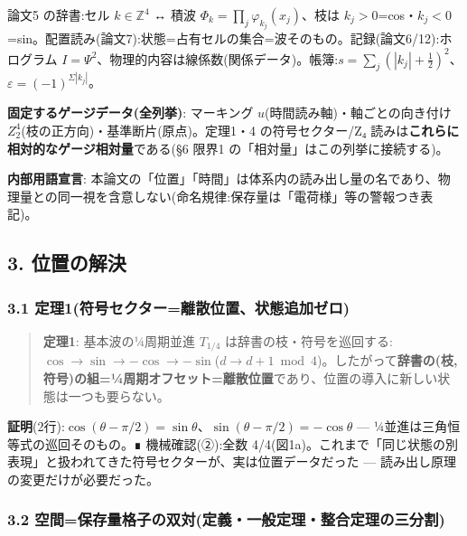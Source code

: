 \documentclass[
]{ltjsarticle}
\begin{document}
論文5 の辞書:セル \(k\in\mathbb{Z}^4\) ↔ 積波
\(\Phi_k=\prod_j\varphi_{k_j}(x_j)\)、枝は
\(k_j>0\)=cos・\(k_j<0\)=sin。配置読み(論文7):状態=占有セルの集合=波そのもの。記録(論文6/12):ホログラム
\(I=\Psi^2\)、物理的内容は線係数(関係データ)。帳簿:\(s=\sum_j(|k_j|+\tfrac12)^2\)、\(\varepsilon=(-1)^{\Sigma|k_j|}\)。

\textbf{固定するゲージデータ(全列挙)}: マーキング
\(u\)(時間読み軸)・軸ごとの向き付け
\(Z_2^{4}\)(枝の正方向)・基準断片(原点)。定理1・4 の符号セクター/Z₄
読みは\textbf{これらに相対的なゲージ相対量}である(§6 限界1
の「相対量」はこの列挙に接続する)。

\textbf{内部用語宣言}:
本論文の「位置」「時間」は体系内の読み出し量の名であり、物理量との同一視を含意しない(命名規律:保存量は「電荷様」等の警報つき表記)。

\subsection{3. 位置の解決}\label{ux4f4dux7f6eux306eux89e3ux6c7a}

\subsubsection{3.1
定理1(符号セクター=離散位置、状態追加ゼロ)}\label{ux5b9aux74061ux7b26ux53f7ux30bbux30afux30bfux30fcux96e2ux6563ux4f4dux7f6eux72b6ux614bux8ffdux52a0ux30bcux30ed}

\begin{quote}
\textbf{定理1}: 基本波の¼周期並進 \(T_{1/4}\)
は辞書の枝・符号を巡回する:\(\cos\to\sin\to-\cos\to-\sin\)(\(d\to d+1\bmod 4\))。したがって\textbf{辞書の(枝,
符号)の組=¼周期オフセット=離散位置}であり、位置の導入に新しい状態は一つも要らない。
\end{quote}

\textbf{証明}(2行):\(\cos(\theta-\pi/2)=\sin\theta\)、\(\sin(\theta-\pi/2)=-\cos\theta\)
--- ¼並進は三角恒等式の巡回そのもの。∎ 機械確認(②):全数
4/4(図1a)。これまで「同じ状態の別表現」と扱われてきた符号セクターが、実は位置データだった
--- 読み出し原理の変更だけが必要だった。

\subsubsection{3.2
空間=保存量格子の双対(定義・一般定理・整合定理の三分割)}\label{ux7a7aux9593ux4fddux5b58ux91cfux683cux5b50ux306eux53ccux5bfeux5b9aux7fa9ux4e00ux822cux5b9aux7406ux6574ux5408ux5b9aux7406ux306eux4e09ux5206ux5272}
\end{document}
